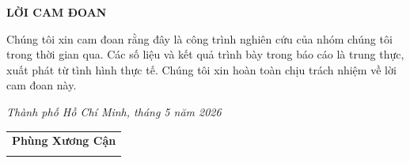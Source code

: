 \thispagestyle{empty}
\begin{center}
    \textbf{\Large LỜI CAM ĐOAN}
\end{center}

\vspace{1cm}

Chúng tôi xin cam đoan rằng đây là công trình nghiên cứu của nhóm chúng tôi
trong thời gian qua. Các số liệu và kết quả trình bày trong báo cáo là trung
thực, xuất phát từ tình hình thực tế. Chúng tôi xin hoàn toàn chịu trách
nhiệm về lời cam đoan này.

\vspace{2cm}

\begin{flushright}
    \textit{Thành phố Hồ Chí Minh, tháng 5 năm 2026}\\[1cm]
    \begin{tabular}{c}
        \textbf{Phùng Xương Cận} \\[2cm]
        \hrulefill
    \end{tabular}
\end{flushright}
